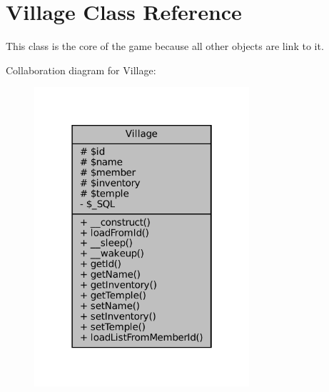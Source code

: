 \hypertarget{classVillage}{}\section{Village Class Reference}
\label{classVillage}


This class is the core of the game because all other objects are link to it.  




Collaboration diagram for Village\+:
\nopagebreak
\begin{figure}[H]
\begin{center}
\leavevmode
\includegraphics[width=226pt]{classVillage__coll__graph}
\end{center}
\end{figure}
